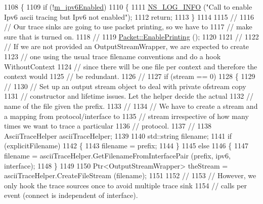 \begin{DoxyCode}
1108 \{
1109   \textcolor{keywordflow}{if} (!\hyperlink{classns3_1_1InternetStackHelper_a2eade9878232a41166cd0638cab7c3bf}{m\_ipv6Enabled})
1110     \{
1111       \hyperlink{group__logging_gafbd73ee2cf9f26b319f49086d8e860fb}{NS\_LOG\_INFO} (\textcolor{stringliteral}{"Call to enable Ipv6 ascii tracing but Ipv6 not enabled"});
1112       \textcolor{keywordflow}{return};
1113     \}
1114 
1115   \textcolor{comment}{//}
1116   \textcolor{comment}{// Our trace sinks are going to use packet printing, so we have to }
1117   \textcolor{comment}{// make sure that is turned on.}
1118   \textcolor{comment}{//}
1119   \hyperlink{classns3_1_1Packet_ae17c0cd8e63e83df3c9273801e3d5d7f}{Packet::EnablePrinting} ();
1120 
1121   \textcolor{comment}{//}
1122   \textcolor{comment}{// If we are not provided an OutputStreamWrapper, we are expected to create }
1123   \textcolor{comment}{// one using the usual trace filename conventions and do a hook WithoutContext}
1124   \textcolor{comment}{// since there will be one file per context and therefore the context would}
1125   \textcolor{comment}{// be redundant.}
1126   \textcolor{comment}{//}
1127   \textcolor{keywordflow}{if} (stream == 0)
1128     \{
1129       \textcolor{comment}{//}
1130       \textcolor{comment}{// Set up an output stream object to deal with private ofstream copy }
1131       \textcolor{comment}{// constructor and lifetime issues.  Let the helper decide the actual}
1132       \textcolor{comment}{// name of the file given the prefix.}
1133       \textcolor{comment}{//}
1134       \textcolor{comment}{// We have to create a stream and a mapping from protocol/interface to }
1135       \textcolor{comment}{// stream irrespective of how many times we want to trace a particular }
1136       \textcolor{comment}{// protocol.}
1137       \textcolor{comment}{//}
1138       AsciiTraceHelper asciiTraceHelper;
1139 
1140       std::string filename;
1141       \textcolor{keywordflow}{if} (explicitFilename)
1142         \{
1143           filename = prefix;
1144         \}
1145       \textcolor{keywordflow}{else}
1146         \{
1147           filename = asciiTraceHelper.GetFilenameFromInterfacePair (prefix, ipv6, interface);
1148         \}
1149 
1150       Ptr<OutputStreamWrapper> theStream = asciiTraceHelper.CreateFileStream (filename);
1151 
1152       \textcolor{comment}{//}
1153       \textcolor{comment}{// However, we only hook the trace sources once to avoid multiple trace sink}
1154       \textcolor{comment}{// calls per event (connect is independent of interface).}

\end{DoxyCode}
